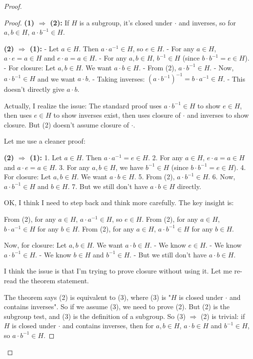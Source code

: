 \begin{proof}
\begin{proof}
\textbf{(1) $\Rightarrow$ (2):} If $H$ is a subgroup, it's closed under $\cdot$ and inverses, so for $a, b \in H$, $a \cdot b^{-1} \in H$.

\textbf{(2) $\Rightarrow$ (1):} 
- Let $a \in H$. Then $a \cdot a^{-1} \in H$, so $e \in H$.
- For any $a \in H$, $a \cdot e = a \in H$ and $e \cdot a = a \in H$.
- For any $a, b \in H$, $b^{-1} \in H$ (since $b \cdot b^{-1} = e \in H$).
- For closure: Let $a, b \in H$. We want $a \cdot b \in H$.
- From (2), $a \cdot b^{-1} \in H$.
- Now, $a \cdot b^{-1} \in H$ and we want $a \cdot b$.
- Taking inverses: $(a \cdot b^{-1})^{-1} = b \cdot a^{-1} \in H$.
- This doesn't directly give $a \cdot b$.

Actually, I realize the issue: The standard proof uses $a \cdot b^{-1} \in H$ to show $e \in H$, then uses $e \in H$ to show inverses exist, then uses closure of $\cdot$ and inverses to show closure. But (2) doesn't assume closure of $\cdot$.

Let me use a cleaner proof:

\textbf{(2) $\Rightarrow$ (1):}
1. Let $a \in H$. Then $a \cdot a^{-1} = e \in H$.
2. For any $a \in H$, $e \cdot a = a \in H$ and $a \cdot e = a \in H$.
3. For any $a, b \in H$, we have $b^{-1} \in H$ (since $b \cdot b^{-1} = e \in H$).
4. For closure: Let $a, b \in H$. We want $a \cdot b \in H$.
5. From (2), $a \cdot b^{-1} \in H$.
6. Now, $a \cdot b^{-1} \in H$ and $b \in H$.
7. But we still don't have $a \cdot b \in H$ directly.

OK, I think I need to step back and think more carefully. The key insight is:

From (2), for any $a \in H$, $a \cdot a^{-1} \in H$, so $e \in H$.
From (2), for any $a \in H$, $b \cdot a^{-1} \in H$ for any $b \in H$.
From (2), for any $a \in H$, $a \cdot b^{-1} \in H$ for any $b \in H$.

Now, for closure: Let $a, b \in H$. We want $a \cdot b \in H$.
- We know $e \in H$.
- We know $a \cdot b^{-1} \in H$.
- We know $b \in H$ and $b^{-1} \in H$.
- But we still don't have $a \cdot b \in H$.

I think the issue is that I'm trying to prove closure without using it. Let me re-read the theorem statement.

The theorem says (2) is equivalent to (3), where (3) is "$H$ is closed under $\cdot$ and contains inverses". So if we assume (3), we need to prove (2). But (2) is the subgroup test, and (3) is the definition of a subgroup. So (3) $\Rightarrow$ (2) is trivial: if $H$ is closed under $\cdot$ and contains inverses, then for $a, b \in H$, $a \cdot b \in H$ and $b^{-1} \in H$, so $a \cdot b^{-1} \in H$.


\end{proof}
\end{proof}
